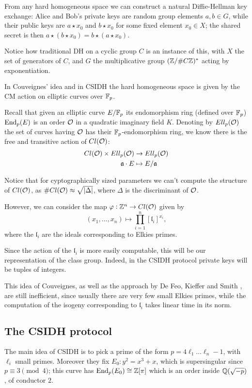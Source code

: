 From any hard homogeneous space we can construct a natural Diffie-Hellman key exchange: Alice and Bob's private keys are random group elements $a,b\in G$, while their public keys are $a\star x_0$ and $b\star x_0$ for some fixed element $x_0\in X$; the shared secret is then $a\star(b\star x_0)=b\star(a\star x_0)$.

Notice how traditional DH on a cyclic group $C$ is an instance of this, with $X$ the set of generators of $C$, and $G$ the multiplicative group $(\mathbb{Z}/\# C\mathbb{Z})^\ast$ acting by exponentiation.

In Couveignes' idea and in CSIDH the hard homogeneous space is given by the CM action on elliptic curves over $\mathbb{F}_p$.

Recall that given an elliptic curve $E/\mathbb{F}_p$ its endomorphism ring (defined over $\mathbb{F}_p$) $\operatorname{End}_p(E)$ is an order $\mathcal{O}$ in a quadratic imaginary field $K$. Denoting by $Ell_p(\mathcal{O})$ the set of curves having $\mathcal{O}$ has their $\mathbb{F}_p$-endomorphism ring, we know there is the free and transitive action of $Cl(\mathcal{O})$:
\begin{align*}
    Cl(\mathcal{O})\times Ell_p(\mathcal{O}) & \to  Ell_p(\mathcal{O})\\
    \mathfrak{a}\cdot E & \mapsto  E/\mathfrak{a}
\end{align*}

Notice that for cyptographically sized parameters we can't compute the structure of $Cl(\mathcal{O})$, as $\# Cl(\mathcal{O})\approx \sqrt{|\Delta|}$, where $\Delta$ is the discriminant of $\mathcal{O}$.

However, we can consider the map $\varphi:\mathbb{Z}^n\to Cl(\mathcal{O})$ given by
$$(x_1,\dots,x_n)\mapsto \prod_{i=1}^n[\mathfrak{l}_i]^{x_i},$$
where the $\mathfrak{l}_i$ are the ideals corresponding to Elkies primes.

Since the action of the $\mathfrak{l}_i$ is more easily computable, this will be our representation of the class group. Indeed, in the CSIDH protocol private keys will be tuples of integers.

This idea of Couveignes, as well as the approach by De Feo, Kieffer and Smith \cite{DeFeo_CSIDH}, are still inefficient, since usually there are very few small Elkies primes, while the computation of the isogeny corresponding to $\mathfrak{l}_i$ takes linear time in its norm.

\subsection{The CSIDH protocol}
The main idea of CSIDH is to pick a prime of the form $p=4\ell_1\dots\ell_n-1$, with $\ell_i$ small primes. Moreover they fix $E_0: y^2=x^3+x$, which is supersingular since $p\equiv3\pmod 4$; this curve has $\operatorname{End}_p(E_0)\cong\mathbb{Z}[\pi]$ which is an order inside $\mathbb{Q}(\sqrt{-p})$, of conductor $2$.

